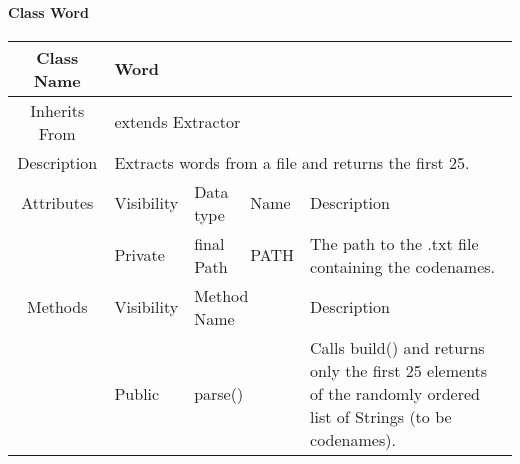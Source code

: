 \paragraph{Class Word}\mbox{}
\begin{tabularx}{\textwidth}{|c||l|l|l|X|}
    \hline
    \cellcolor{lightgray}Class Name & \multicolumn{4}{X|}{Word}\\
    \hline
    \cellcolor{lightgray}Inherits From & \multicolumn{4}{X|}{extends Extractor}\\
    \hline
    \cellcolor{lightgray}Description & \multicolumn{4}{p{12cm}|}{Extracts words from a file and returns the first 25.}\\
    \hline\hline
    \cellcolor{lightgray}Attributes & \cellcolor{lightgray}Visibility & \cellcolor{lightgray}Data type & \cellcolor{lightgray}Name & \cellcolor{lightgray}Description\\\cline{2-5}
    \cellcolor{lightgray} & Private & final Path & PATH & The path to the .txt file containing the codenames.\\
    \hline\hline
    \cellcolor{lightgray}Methods & \cellcolor{lightgray}Visibility & \multicolumn{2}{l|}{\cellcolor{lightgray}Method Name} & \cellcolor{lightgray}Description\\\cline{2-5}
    \hline
    \cellcolor{lightgray} & Public & \multicolumn{2}{l|}{parse()} & Calls build() and returns only the first 25 elements of the randomly ordered list of Strings (to be codenames).\\
    \hline
\end{tabularx}